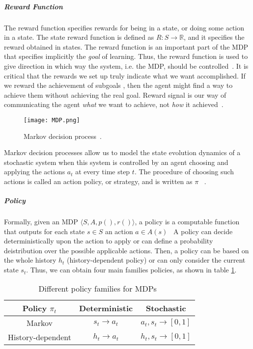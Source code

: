 \subparagraph{Reward Function} The reward function specifies rewards for being in a state, or doing some action in a state. The state reward function is defined as $R : S \rightarrow \mathbb{R}$, and it specifies the reward obtained in states. The reward function is an important part of the MDP that specifies implicitly the \textit{goal} of learning. Thus, the reward function is used to give direction in which way the system, i.e. the MDP, should be controlled~\cite{wiering2012reinforcement}. It is critical that the rewards we set up truly indicate what we want accomplished. If we reward the achievement of subgoals , then the agent might find a way to achieve them without achieving the real goal. Reward signal is our way of communicating the agent \textit{what} we want to achieve, not \textit{how} it achieved~\cite{SuttonBarto}.

\begin{figure}[h!]
	\centering
	\texttt{[image: MDP.png]}
	\caption{Markov decision process~\cite{Sigaud:2010:MDP:1841781}.}
	\label{fig:MDP}
\end{figure}

Markov decision processes allow us to model the state evolution dynamics of a
stochastic system when this system is controlled by an agent choosing and applying
the actions $a_t$ at every time step $t$. The procedure of choosing such actions is called
an action policy, or strategy, and is written as $\pi$~\cite{Sigaud:2010:MDP:1841781} .

\subparagraph{Policy} Formally, given an MDP $\bigl\langle S, A, p(), r() \bigr\rangle$, a policy is a computable function that outputs for each state $s \in S$ an action $a \in A(s)$~\cite{wiering2012reinforcement} A policy can decide deterministically upon the action to apply or can define a probability deistribution over the possible applicable actions. Then, a policy can be based on the whole history $h_t$ (history-dependent policy) or can only consider the current state $s_t$. Thus, we can obtain four main families policies, as shown in table \ref{table:T1}.

\begin{table}[h!]
\centering
\begin{tabular}{|c|c|c|}
	\hline Policy $\pi_t$
	&Deterministic &Stochastic  \\
	\hline 
	\hline Markov 
	&$s_t \rightarrow a_t$  &$a_t, s_t \rightarrow [0, 1]$ \\ 
	\hline History-dependent
	&$h_t \rightarrow a_t$  &$h_t, s_t \rightarrow [0,1]$  \\ 
	\hline 
\end{tabular}
\caption{Different policy families for MDPs~\cite{Sigaud:2010:MDP:1841781}}
\label{table:T1}
\end{table} 

